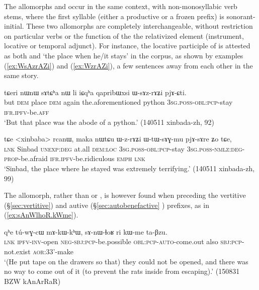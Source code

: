 The allomorphs  and  occur in the same context, with non-monosyllabic verb stems, where the first syllable (either a productive or a frozen prefix) is sonorant-initial. These two allomorphs are completely interchangeable, without restriction on particular verbs or the function of the the relativized element (instrument, locative or temporal adjunct). For instance, the locative participle of  is attested as both  and  `the place when he/it stays' in the corpus, as shown by examples (\ref{ex:WsAzrAZi}) and (\ref{ex:WzrAZi}), a few sentences away from each other in the same story.

\begin{exe}
\ex \label{ex:WsAzrAZi}
\gll  tɕeri nɯnɯ sɤtɕʰa nɯ li iɕqʰa qapribɯxsi ɯ-sɤz-rɤʑi pjɤ-ɕti. \\
but \textsc{dem} place \textsc{dem} again the.aforementioned python \textsc{3sg}.\textsc{poss}-\textsc{obl}:\textsc{pcp}-stay \textsc{ifr}.\textsc{ipfv}-be.\textsc{aff} \\
\glt `But that place was the abode of a python.' (140511 xinbada-zh, 92)
\end{exe}

\begin{exe}
\ex \label{ex:WzrAZi}
\gll tɕe <xinbaba> rcanɯ, maka nɯtɕu ɯ-z-rɤʑi ɯ-tɯ-sɤɣ-mu pjɤ-sɤre ʑo tɕe,\\
\textsc{lnk} Sinbad \textsc{unexp}:\textsc{deg} at.all \textsc{dem}:\textsc{loc} \textsc{3sg}.\textsc{poss}-\textsc{obl}:\textsc{pcp}-stay \textsc{3sg}.\textsc{poss}-\textsc{nmlz}:\textsc{deg}-\textsc{prop}-be.afraid \textsc{ifr}.\textsc{ipfv}-be.ridiculous \textsc{emph} \textsc{lnk}\\
\glt `Sinbad, the place where he stayed was extremely terrifying.' (140511 xinbada-zh, 99)
\end{exe}

The  allomorph, rather than  or , is however found when preceding the vertitive (§\ref{sec:vertitive}) and autive (§\ref{sec:autobenefactive} ) prefixes, as in (\ref{ex:sAnWlhoR.kWme}).

\begin{exe}
\ex \label{ex:sAnWlhoR.kWme}
\gll  qʰe tú-wɣ-cɯ mɤ-kɯ-kʰɯ, sɤ-nɯ-ɬoʁ ri kɯ-me ta-βzu. \\
\textsc{lnk} \textsc{ipfv}-\textsc{inv}-open \textsc{neg}-\textsc{sbj}:\textsc{pcp}-be.possible \textsc{obl}:\textsc{pcp}-\textsc{auto}-come.out also \textsc{sbj}:\textsc{pcp}-not.exist \textsc{aor}:3\fl{}3'-make \\
\glt `(He put tape on the drawers so that) they could not be opened, and there was no way to come out of it (to prevent the rats inside from escaping).' (150831 BZW kAnArRaR)
\end{exe}

